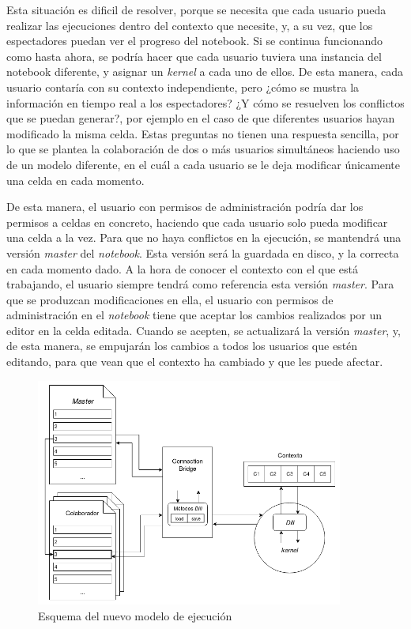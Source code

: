 \documentclass[11pt,spanish,listoffigures]{tfgetsinf}
\begin{document}
Esta situación es dificil de resolver, porque se necesita que cada usuario pueda realizar las ejecuciones dentro del contexto que necesite, y, a su vez, que los espectadores puedan ver el progreso del notebook. Si se continua funcionando como hasta ahora, se podría hacer que cada usuario tuviera una instancia del notebook diferente, y asignar un \textit{kernel} a cada uno de ellos. De esta manera, cada usuario contaría con su contexto independiente, pero ¿cómo se mustra la información en tiempo real a los espectadores? ¿Y cómo se resuelven los conflictos que se puedan generar?, por ejemplo en el caso de que diferentes usuarios hayan modificado la misma celda. Estas preguntas no tienen una respuesta sencilla, por lo que se plantea la colaboración de dos o más usuarios simultáneos haciendo uso de un modelo diferente, en el cuál a cada usuario se le deja modificar únicamente una celda en cada momento.

De esta manera, el usuario con permisos de administración podría dar los permisos a celdas en concreto, haciendo que cada usuario solo pueda modificar una celda a la vez. Para que no haya conflictos en la ejecución, se mantendrá una versión \textit{master} del \textit{notebook}. Esta versión será la guardada en disco, y la correcta en cada momento dado. A la hora de conocer el contexto con el que está trabajando, el usuario siempre tendrá como referencia esta versión \textit{master}. Para que se produzcan modificaciones en ella, el usuario con permisos de administración en el \textit{notebook} tiene que aceptar los cambios realizados por un editor en la celda editada. Cuando se acepten, se actualizará la versión \textit{master}, y, de esta manera, se empujarán los cambios a todos los usuarios que estén editando, para que vean que el contexto ha cambiado y que les puede afectar.

\begin{figure}[H]
	\centering
  	\includegraphics[width=0.9\textwidth]{mejora_ejecucion.png}
  	\caption{Esquema del nuevo modelo de ejecución}
  	\label{fig:new-exec}
\end{figure}
\end{document}
